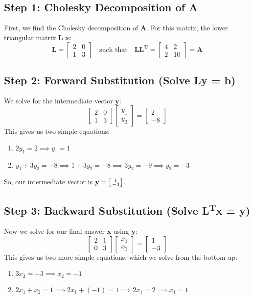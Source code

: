 \documentclass{article}
\begin{document}
\subsection{Step 1: Cholesky Decomposition of A}
First, we find the Cholesky decomposition of $\mathbf{A}$. For this matrix, the lower triangular matrix $\mathbf{L}$ is:
\[ \mathbf{L} = \begin{bmatrix} 2 & 0 \\ 1 & 3 \end{bmatrix} \quad \text{such that} \quad \mathbf{LL^T} = \begin{bmatrix} 4 & 2 \\ 2 & 10 \end{bmatrix} = \mathbf{A} \]

\subsection{Step 2: Forward Substitution (Solve Ly = b)}
We solve for the intermediate vector $\mathbf{y}$:
\[ \begin{bmatrix} 2 & 0 \\ 1 & 3 \end{bmatrix} \begin{bmatrix} y_1 \\ y_2 \end{bmatrix} = \begin{bmatrix} 2 \\ -8 \end{bmatrix} \]
This gives us two simple equations:
\begin{enumerate}
    \item $2y_1 = 2 \implies y_1 = 1$
    \item $y_1 + 3y_2 = -8 \implies 1 + 3y_2 = -8 \implies 3y_2 = -9 \implies y_2 = -3$
\end{enumerate}
So, our intermediate vector is $\mathbf{y} = \begin{bsmallmatrix} 1 \\ -3 \end{bsmallmatrix}$.

\subsection{Step 3: Backward Substitution (Solve L\textsuperscript{T}x = y)}
Now we solve for our final answer $\mathbf{x}$ using $\mathbf{y}$:
\[ \begin{bmatrix} 2 & 1 \\ 0 & 3 \end{bmatrix} \begin{bmatrix} x_1 \\ x_2 \end{bmatrix} = \begin{bmatrix} 1 \\ -3 \end{bmatrix} \]
This gives us two more simple equations, which we solve from the bottom up:
\begin{enumerate}
    \item $3x_2 = -3 \implies x_2 = -1$
    \item $2x_1 + x_2 = 1 \implies 2x_1 + (-1) = 1 \implies 2x_1 = 2 \implies x_1 = 1$
\end{enumerate}
\end{document}
